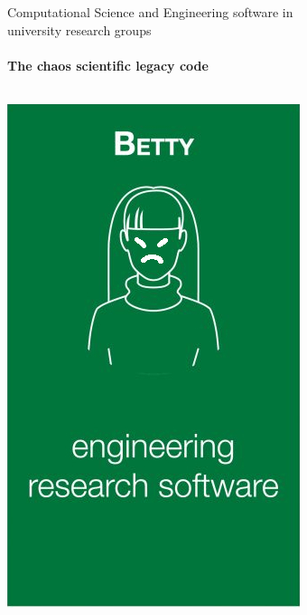 \begin{frame}{Computational Science and Engineering software in\\university research groups}
    \framesubtitle{The chaos scientific legacy code}
        \vfill
	
    \begin{columns}
        \begin{column}[c]{0.2\textwidth}
            \begin{center}
            \includegraphics[width=\textwidth]{figures/betty.jpg}
            \end{center}

\end{column}
\end{columns}
\end{frame}

